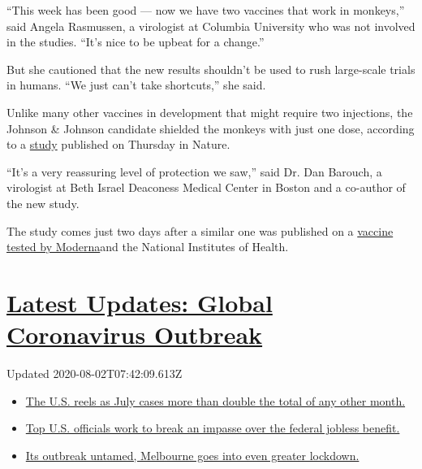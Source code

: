``This week has been good --- now we have two vaccines that work in
monkeys,'' said Angela Rasmussen, a virologist at Columbia University
who was not involved in the studies. ``It's nice to be upbeat for a
change.''

But she cautioned that the new results shouldn't be used to rush
large-scale trials in humans. ``We just can't take shortcuts,'' she
said.

Unlike many other vaccines in development that might require two
injections, the Johnson \& Johnson candidate shielded the monkeys with
just one dose, according to a
\href{https://www.nature.com/articles/s41586-020-2607-z}{study}
published on Thursday in Nature.

``It's a very reassuring level of protection we saw,'' said Dr. Dan
Barouch, a virologist at Beth Israel Deaconess Medical Center in Boston
and a co-author of the new study.

The study comes just two days after a similar one was published on a
\href{https://www.nytimes.com/2020/07/28/health/coronavirus-moderna-vaccine-monkeys.html}{vaccine
tested by Moderna}and the National Institutes of Health.

\hypertarget{latest-updates-global-coronavirus-outbreak}{%
\section{\texorpdfstring{\href{https://www.nytimes.com/2020/08/01/world/coronavirus-covid-19.html?action=click\&pgtype=Article\&state=default\&region=MAIN_CONTENT_1\&context=storylines_live_updates}{Latest
Updates: Global Coronavirus
Outbreak}}{Latest Updates: Global Coronavirus Outbreak}}\label{latest-updates-global-coronavirus-outbreak}}

Updated 2020-08-02T07:42:09.613Z

\begin{itemize}
\tightlist
\item
  \href{https://www.nytimes.com/2020/08/01/world/coronavirus-covid-19.html?action=click\&pgtype=Article\&state=default\&region=MAIN_CONTENT_1\&context=storylines_live_updates\#link-34047410}{The
  U.S. reels as July cases more than double the total of any other
  month.}
\item
  \href{https://www.nytimes.com/2020/08/01/world/coronavirus-covid-19.html?action=click\&pgtype=Article\&state=default\&region=MAIN_CONTENT_1\&context=storylines_live_updates\#link-780ec966}{Top
  U.S. officials work to break an impasse over the federal jobless
  benefit.}
\item
  \href{https://www.nytimes.com/2020/08/01/world/coronavirus-covid-19.html?action=click\&pgtype=Article\&state=default\&region=MAIN_CONTENT_1\&context=storylines_live_updates\#link-2bc8948}{Its
  outbreak untamed, Melbourne goes into even greater lockdown.}
\end{itemize}

